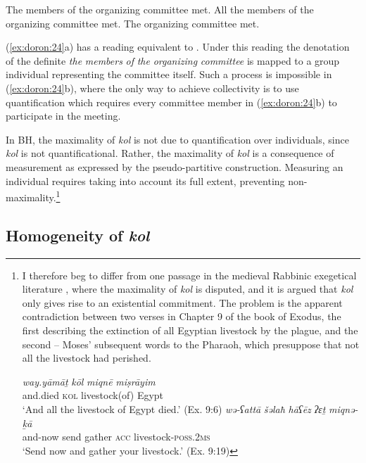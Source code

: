 \documentclass[output=paper]{langsci/langscibook}
\begin{document}
\ea%
    \label{ex:doron:24}
    \ea The members of the organizing committee met.
    \ex All the members of the organizing committee met.
    \z
\ex %
    \label{ex:doron:25}
    The organizing committee met.
\z

(\ref{ex:doron:24}a) has a reading equivalent to . Under this reading the denotation of the definite \textit{the} \textit{members} \textit{of} \textit{the} \textit{organizing} \textit{committee} is mapped to a group individual representing the committee itself. Such a process is impossible in (\ref{ex:doron:24}b), where the only way to achieve collectivity is to use quantification which requires every committee member in (\ref{ex:doron:24}b) to participate in the meeting.

In BH, the maximality of \textit{kol} is not due to quantification over individuals, since \textit{kol} is not quantificational. Rather, the maximality of \textit{kol} is a consequence of measurement as expressed by the pseudo-partitive construction. Measuring an individual requires taking into account its full extent, preventing non-maximality.\footnote{I therefore beg to differ from one passage in the medieval Rabbinic exegetical literature \citep[245]{Assaf1929}, where the maximality of \textit{kol} is disputed, and it is argued that \textit{kol} only gives rise to an existential commitment. The problem is the apparent contradiction between two verses in Chapter 9 of the book of Exodus, the first describing the extinction of all Egyptian livestock by the plague, and the second – Moses’ subsequent words to the Pharaoh, which presuppose that not all the livestock had perished.

\ea
\gll \textit{way.yāmāṯ}  \textit{kōl}   \textit{miqnē}   \textit{miṣrāyim}\\ 
      and.died           \textsc{kol}   livestock(of) Egypt\\
\glt `And all the livestock of Egypt died.' (Ex. 9:6) 
\ex 
\gll \textit{wə-ʕattā}  \textit{šəlaħ}  \textit{hāʕēz} \textit{ʔɛṯ}    \textit{miqnə-ḵā}\\
     and-now  send  gather \textsc{acc} livestock-\textsc{poss.2ms}\\
\glt `Send now and gather your livestock.' (Ex. 9:19)
\z}

\subsection{Homogeneity of \textit{kol}}\label{sec:doron:3.3}%
\end{document}
